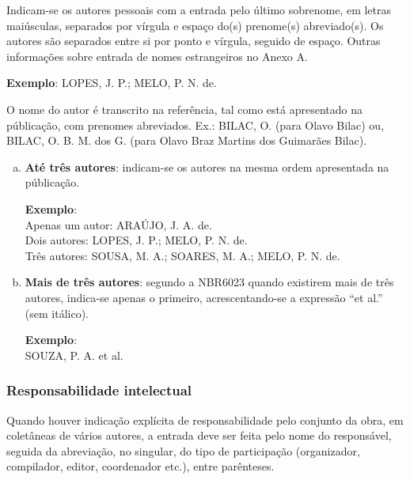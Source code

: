 Indicam-se os autores pessoais com a entrada pelo último sobrenome, em letras maiúsculas, separados por vírgula e espaço do(s) prenome(s) abreviado(s). Os autores são separados entre si por ponto e vírgula, seguido de espaço. Outras informações sobre entrada de nomes estrangeiros no Anexo A.

\begin{exemplomanual}
\textbf{Exemplo}:
LOPES, J. P.; MELO, P. N. de.
\end{exemplomanual}

O nome do autor é transcrito na referência, tal como está apresentado na públicação, com prenomes abreviados. Ex.: BILAC, O. (para Olavo Bilac) ou, BILAC, O. B. M. dos G. (para Olavo Braz Martins dos Guimarães Bilac).

\begin{enumerate}[a)]
  \item  \textbf{Até três autores}: indicam-se os autores na mesma ordem apresentada na públicação.

\begin{exemplomanuallista}
\textbf{Exemplo}:\\
Apenas um autor: ARAÚJO, J. A. de.\\
Dois autores: LOPES, J. P.; MELO, P. N. de.\\
Três autores: SOUSA, M. A.; SOARES, M. A.; MELO, P. N. de.
\end{exemplomanuallista}
  
  \item  \textbf{Mais de três autores}: segundo a NBR6023 \cite{NBR6023:2002} quando existirem mais de três autores, indica-se apenas o primeiro, acrescentando-se a expressão ``et al.'' (sem itálico).

  \begin{exemplomanuallista}
  \textbf{Exemplo}:\\
  SOUZA, P. A. et al.
  \end{exemplomanuallista}
\end{enumerate}


\subsubsection{Responsabilidade intelectual}

Quando houver indicação explícita de responsabilidade pelo conjunto da obra, em coletâneas de vários autores, a entrada deve ser feita pelo nome do responsável, seguida da abreviação, no singular, do tipo de participação (organizador, compilador, editor, coordenador etc.), entre parênteses.

